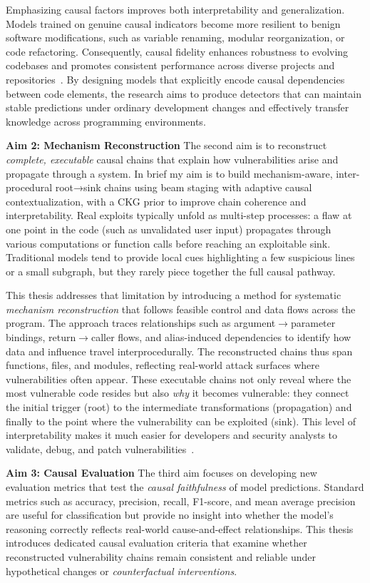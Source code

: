 \documentclass{buthesis}
\begin{document}
Emphasizing causal factors improves both interpretability and generalization. Models trained on genuine causal indicators become more resilient to benign software modifications, such as variable renaming, modular reorganization, or code refactoring. Consequently, causal fidelity enhances robustness to evolving codebases and promotes consistent performance across diverse projects and repositories~\cite{Li2022Empirical,yang2022natural}. By designing models that explicitly encode causal dependencies between code elements, the research aims to produce detectors that can maintain stable predictions under ordinary development changes and effectively transfer knowledge across programming environments.

\textbf{Aim 2: Mechanism Reconstruction}
The second aim is to reconstruct \emph{complete, executable} causal chains that explain how vulnerabilities arise and propagate through a system. In brief my aim is to build mechanism-aware, inter-procedural root→sink chains using beam staging with adaptive causal contextualization, with a CKG prior to improve chain coherence and interpretability. Real exploits typically unfold as multi-step processes: a flaw at one point in the code (such as unvalidated user input) propagates through various computations or function calls before reaching an exploitable sink. Traditional models tend to provide local cues highlighting a few suspicious lines or a small subgraph, but they rarely piece together the full causal pathway.

This thesis addresses that limitation by introducing a method for systematic \emph{mechanism reconstruction} that follows feasible control and data flows across the program. The approach traces relationships such as argument$\rightarrow$parameter bindings, return$\rightarrow$caller flows, and alias-induced dependencies to identify how data and influence travel interprocedurally. The reconstructed chains thus span functions, files, and modules, reflecting real-world attack surfaces where vulnerabilities often appear. These executable chains not only reveal where the most vulnerable code resides but also \emph{why} it becomes vulnerable: they connect the initial trigger (root) to the intermediate transformations (propagation) and finally to the point where the vulnerability can be exploited (sink). This level of interpretability makes it much easier for developers and security analysts to validate, debug, and patch vulnerabilities~\cite{Le2024MBU,Nong2023ICSE,Woo2023USENIX}.

\textbf{Aim 3: Causal Evaluation}
The third aim focuses on developing new evaluation metrics that test the \emph{causal faithfulness} of model predictions. Standard metrics such as accuracy, precision, recall, F1-score, and mean average precision are useful for classification but provide no insight into whether the model’s reasoning correctly reflects real-world cause-and-effect relationships. This thesis introduces dedicated causal evaluation criteria that examine whether reconstructed vulnerability chains remain consistent and reliable under hypothetical changes or \emph{counterfactual interventions}.
\end{document}
